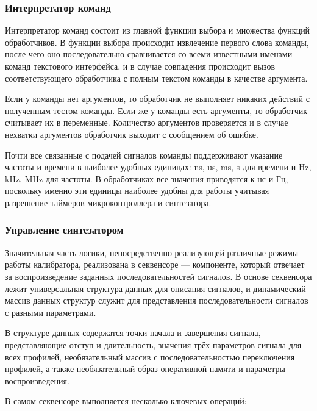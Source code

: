 \documentclass[rusmathsym, eqnumwithinsec, amspack, hyperref]{bomgost}
\begin{document}
\subsubsection{Интерпретатор команд}

Интерпретатор команд состоит из главной функции выбора и множества функций обработчиков. В функции выбора происходит извлечение первого слова команды, после чего оно последовательно сравнивается со всеми известными именами команд текстового интерфейса, и в случае совпадения происходит вызов соответствующего обработчика с полным текстом команды в качестве аргумента.

Если у команды нет аргументов, то обработчик не выполняет никаких действий с полученным тестом команды. Если же у команды есть аргументы, то обработчик считывает их в переменные. Количество аргументов проверяется и в случае нехватки аргументов обработчик выходит с сообщением об ошибке.

Почти все связанные с подачей сигналов команды поддерживают указание частоты и времени в наиболее удобных единицах: ns, us, ms, s для времени и Hz, kHz, MHz для частоты. В обработчиках все значения приводятся к нс и Гц, поскольку именно эти единицы наиболее удобны для работы учитывая разрешение таймеров микроконтроллера и синтезатора.

\subsubsection{Управление синтезатором}

Значительная часть логики, непосредственно реализующей различные режимы работы калибратора, реализована в секвенсоре --- компоненте, который отвечает за воспроизведение заданных последовательностей сигналов. В основе секвенсора лежит универсальная структура данных для описания сигналов, и динамический массив данных структур служит для представления последовательности сигналов с разными параметрами.

В структуре данных содержатся точки начала и завершения сигнала, представляющие отступ и длительность, значения трёх параметров сигнала для всех профилей, необязательный массив с последовательностью переключения профилей, а также необязательный образ оперативной памяти и параметры воспроизведения.

В самом секвенсоре выполняется несколько ключевых операций:
\end{document}
